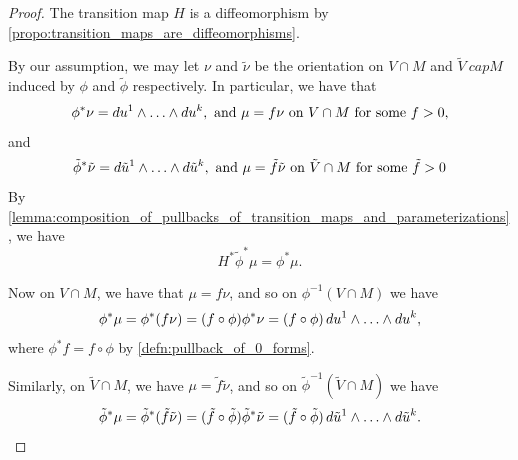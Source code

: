 \documentclass[notoc,notitlepage]{tufte-book}
\begin{document}
\begin{proof}
  The transition map $H$ is a diffeomorphism by
  \cref{propo:transition_maps_are_diffeomorphisms}.

  By our assumption, we may let $\nu$ and $\tilde{\nu}$ be the orientation on $V
  \cap M$ and $\tilde{V}\ cap M$ induced by $\phi$ and $\tilde{\phi}$
  respectively. In particular, we have that
  \begin{equation*}
    \phi^* \nu = \mathop{}\!d{u^1} \land \hdots \land \mathop{}\!d{u^k}, \text{ and } \mu = f
    \nu \text{ on } V \cap M \text{ for some } f > 0,
  \end{equation*}
  and
  \begin{equation*}
    \tilde{\phi}^* \tilde{\nu} = \mathop{}\!d{\tilde{u}^1} \land \hdots \land
    \mathop{}\!d{\tilde{u}^k}, \text{ and } \mu = \tilde{f} \tilde{\nu} \text{ on }
    \tilde{V} \cap M \text{ for some } \tilde{f} > 0
  \end{equation*}
  By
  \cref{lemma:composition_of_pullbacks_of_transition_maps_and_parameterizations},
  we have
  \begin{equation*}
    H^* \tilde{\phi}^* \mu = \phi^* \mu.
  \end{equation*}

  Now on $V \cap M$, we have that $\mu = f \nu$, and so on $\phi^{-1}(V \cap M)$ 
  we have
  \begin{equation*}
    \phi^* \mu = \phi^*(f \nu) = (f \circ \phi)\phi^* \nu = (f \circ \phi)
    \mathop{}\!d{u^1} \land \hdots \land \mathop{}\!d{u^k},
  \end{equation*}
  where $\phi^* f = f \circ \phi$ by \cref{defn:pullback_of_0_forms}.

  Similarly, on $\tilde{V} \cap M$, we have $\mu = \tilde{f} \tilde{\nu}$, and
  so on $\tilde{\phi}^{-1}(\tilde{V} \cap M)$ we have
  \begin{equation*}
    \tilde{\phi}^* \mu = \tilde{\phi}^*(\tilde{f} \tilde{\nu}) = (\tilde{f}
    \circ \tilde{\phi}) \tilde{\phi}^* \tilde{\nu} = (\tilde{f} \circ
    \tilde{\phi})\mathop{}\!d{\tilde{u}^1} \land \hdots \land \mathop{}\!d{\tilde{u}^k}.
  \end{equation*}


\end{proof}
\end{document}
